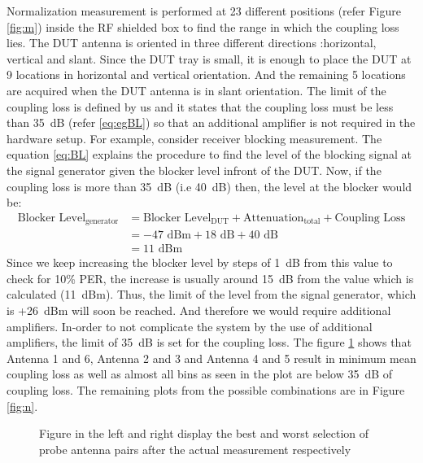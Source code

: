 Normalization measurement is performed at 23 different positions (refer Figure \ref{fig:m}) inside the RF shielded box to find the range in which the coupling loss lies. The \acs{DUT} antenna is oriented in three different directions :horizontal, vertical and slant. Since the \acs{DUT} tray is small, it is enough to place the \acs{DUT} at 9 locations in horizontal and vertical orientation. And the remaining 5 locations are acquired when the \acs{DUT} antenna is in slant orientation. The limit of the coupling loss is defined by us and it states that the coupling loss must be less than 35~dB (refer \ref{eq:egBL}) so that an additional amplifier is not required in the hardware setup. For example, consider receiver blocking measurement. The equation \ref{eq:BL} explains the procedure to find the level of the blocking signal at the signal generator given the blocker level infront of the \acs{DUT}. Now, if the coupling loss is more than 35~dB (i.e 40~dB) then, the level at the blocker would be:
\begin{equation} 
\begin{split}
\mbox{Blocker Level}_{\mbox{generator}}  &= \mbox{Blocker Level}_{\mbox{DUT}} + \mbox{Attenuation}_{\mbox{total}} + \mbox{Coupling Loss} \label{eq:egBL} \\
& = -47 \mbox{~dBm} + 18 \mbox{~dB} + 40 \mbox{~dB} \\
& = 11 \mbox{~dBm} 
\end{split}
\end{equation}
Since we keep increasing the blocker level by steps of 1~dB from this value to check for 10\% \acs{PER}, the increase is usually around 15~dB from the value which is calculated (11~dBm). Thus, the limit of the level from the signal generator, which is +26~dBm will soon be reached. And therefore we would require additional amplifiers. In-order to not complicate the system by the use of additional amplifiers, the limit of 35~dB is set for the coupling loss. The figure \ref{fig:man} shows that Antenna 1 and 6, Antenna 2 and 3 and Antenna 4 and 5 result in minimum mean coupling loss as well as almost all bins as seen in the plot are below 35~dB of coupling loss. The remaining plots from the possible combinations are in Figure \ref{fig:n}.

\begin{figure}[H]
\caption{Figure in the left and right display the best and worst selection of probe antenna pairs after the actual measurement respectively}
\label{fig:man}
\end{figure}

